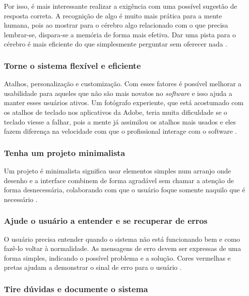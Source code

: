 Por isso, é mais interessante realizar a exigência com uma possível sugestão de resposta correta. A recognição de algo é muito mais prática para a mente humana, pois ao mostrar para o cérebro algo relacionado com o que precisa lembrar-se, dispara-se a memória de forma mais efetiva. Dar uma pista para o cérebro é mais eficiente do que simplesmente perguntar sem oferecer nada \cite{site:nielsenRecall}.

\subsubsection{Torne o sistema flexível e eficiente}

Atalhos, personalização e customização. Com esses fatores é possível melhorar a usabilidade para aqueles que não são mais novatos no \textit{software} e isso ajuda a manter esses usuários ativos. Um fotógrafo experiente, que está acostumado com os atalhos de teclado nos aplicativos da Adobe, teria muita dificuldade se o teclado viesse a falhar, pois a mente já assimilou os atalhos mais usados e eles fazem diferença na velocidade com que o profissional interage com o software \cite{site:nielsenFlexibility}.

\subsubsection{Tenha um projeto minimalista}

Um projeto é minimalista significa usar elementos simples num arranjo onde desenho e a interface combinem de forma agradável sem chamar a atenção de forma desnecessária, colaborando com que o usuário foque somente naquilo que é necessário \cite{site:nielsen}.

\subsubsection{Ajude o usuário a entender e se recuperar de erros}

O usuário precisa entender quando o sistema não está funcionando bem e como fazê-lo voltar à normalidade. As mensagens de erro devem ser expressas de uma forma simples, indicando o possível problema e a solução. 
Cores vermelhas e pretas ajudam a demonstrar o sinal de erro para o usuário \cite{site:nielsenError}.

\subsubsection{Tire dúvidas e documente o sistema}

